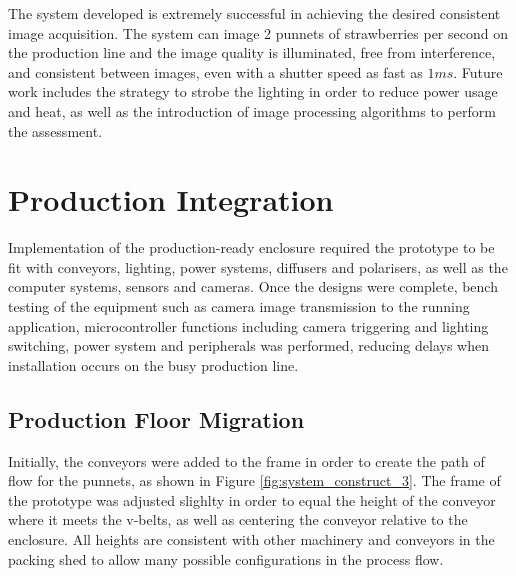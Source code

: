 \documentclass[fleqn,twoside,12pt]{report}
\begin{document}
The system developed is extremely successful in achieving the desired consistent image acquisition. The system can image 2 punnets of strawberries per second on the production line and the image quality is illuminated, free from interference, and consistent between images, even with a shutter speed as fast as $1ms$. Future work includes the strategy to strobe the lighting in order to reduce power usage and heat, as well as the introduction of image processing algorithms to perform the assessment.




\newpage

\chapter{Production Integration}
\label{sec:II}


Implementation of the production-ready enclosure required the prototype to be fit with conveyors, lighting, power systems, diffusers and polarisers, as well as the computer systems, sensors and cameras. Once the designs were complete, bench testing of the equipment such as camera image transmission to the running application, microcontroller functions including camera triggering and lighting switching, power system and peripherals was performed, reducing delays when installation occurs on the busy production line.





\section{Production Floor Migration }


Initially, the conveyors were added to the frame in order to create the path of flow for the punnets, as shown in Figure \ref{fig:system_construct_3}. The frame of the prototype was adjusted slighlty in order to equal the height of the conveyor where it meets the v-belts, as well as centering the conveyor relative to the enclosure. All heights are consistent with other machinery and conveyors in the packing shed to allow many possible configurations in the process flow. 
\end{document}
